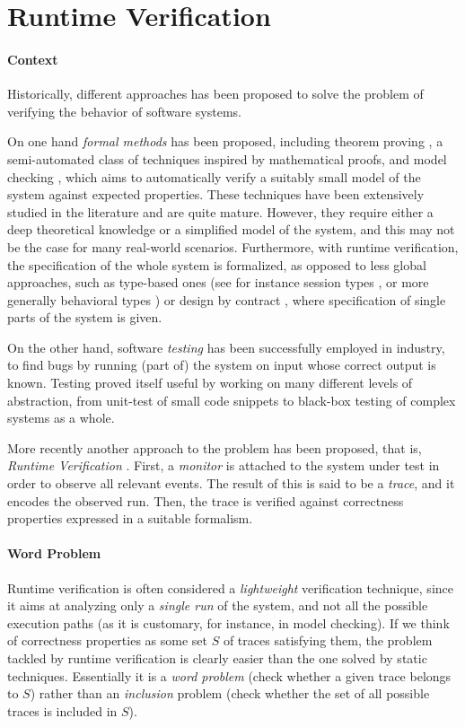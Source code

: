 \section{Runtime Verification}
\label{sec:rv}
\paragraph{Context}
Historically, different approaches has been proposed to solve the problem of verifying the behavior of software systems.

On one hand \emph{formal methods} has been proposed, including theorem proving \cite{itp}, a semi-automated class of techniques inspired by mathematical proofs, and model checking \cite{modelchecking}, which aims to automatically verify a suitably small model of the system against expected properties.
These techniques have been extensively studied in the literature and are quite mature.
However, they require either a deep theoretical knowledge or a simplified model of the system, and this may not be the case for many real-world scenarios.
Furthermore, with runtime verification, the specification of the whole system is formalized, as opposed to less global approaches, such as type-based ones (see for instance session types \cite{sessiontypes}, or more generally behavioral types \cite{AnconaBB0CDGGGH16}) or design by contract \cite{contracts}, where specification of single parts of the system is given.

On the other hand, software \emph{testing} \cite{testing} has been successfully employed in industry, to find bugs by running (part of) the system on input whose correct output is known.
Testing proved itself useful by working on many different levels of abstraction, from unit-test of small code snippets to black-box testing of complex systems as a whole.

More recently another approach to the problem has been proposed, that is, \emph{Runtime Verification} \cite{rv}.
First, a \emph{monitor} is attached to the system under test in order to observe all relevant events.
The result of this is said to be a \emph{trace}, and it encodes the observed run.
Then, the trace is verified against correctness properties expressed in a suitable formalism.

\paragraph{Word Problem}
Runtime verification is often considered a \emph{lightweight} verification technique, since it aims at analyzing only a \emph{single run} of the system, and not all the possible execution paths (as it is customary, for instance, in model checking).
If we think of correctness properties as some set \(S\) of traces satisfying them, the problem tackled by runtime verification is clearly easier than the one solved by static techniques.
Essentially it is a \emph{word problem} (check whether a given trace belongs to \(S\)) rather than an \emph{inclusion} problem (check whether the set of all possible traces is included in \(S\)).

